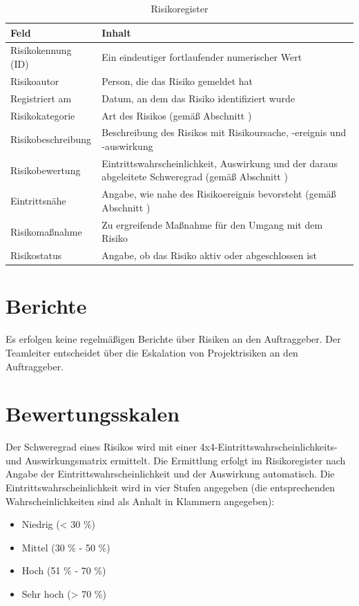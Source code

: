 \documentclass[a4paper,11pt,listof=numbered,glossary=totoc,parskip=half,toc=bib]{scrreprt}
\begin{document}
\begin{table}
\begin{tabularx}{\textwidth}{lX}
	\toprule
	Feld & Inhalt \\
	\midrule
	Risikokennung (ID) & Ein eindeutiger fortlaufender numerischer Wert \\
	 Risikoautor& Person, die das Risiko gemeldet hat \\
	 Registriert am& Datum, an dem das Risiko identifiziert wurde\\
	 Risikokategorie& Art des Risikos (gemäß Abschnitt \nameref{subsec:risikokategorien})\\
	 Risikobeschreibung& Beschreibung des Risikos mit Risikoursache, -ereignis und -auswirkung\\
	 Risikobewertung& Eintrittswahrscheinlichkeit, Auswirkung und der daraus abgeleitete Schweregrad (gemäß Abschnitt \nameref{subsec:bewertungsskalen})\\
	 Eintrittsnähe& Angabe, wie nahe des Risikoereignis bevorsteht (gemäß Abschnitt \nameref{subsec:eintrittsnaehe})\\
	 Risikomaßnahme& Zu ergreifende Maßnahme für den Umgang mit dem Risiko\\
	 Risikostatus& Angabe, ob das Risiko aktiv oder abgeschlossen ist\\
	 \bottomrule
	 
\end{tabularx}
\caption{Risikoregister}
\label{tab:risikoregister}
\end{table}
	
\section{Berichte}

Es erfolgen keine regelmäßigen Berichte über Risiken an den Auftraggeber. Der Teamleiter entscheidet über die Eskalation von Projektrisiken an den Auftraggeber.

\section{Bewertungsskalen}
\label{subsec:bewertungsskalen}

Der Schweregrad eines Risikos wird mit einer 4x4-Eintrittswahrscheinlichkeits- und Auswirkungsmatrix ermittelt. Die Ermittlung erfolgt im Risikoregister nach Angabe der Eintrittswahrscheinlichkeit und der Auswirkung automatisch.
Die Eintrittswahrscheinlichkeit wird in vier Stufen angegeben (die entsprechenden Wahrscheinlichkeiten sind als Anhalt in Klammern angegeben):
\begin{itemize}
	\item Niedrig (< 30 \%)
	\item Mittel (30 \% - 50 \%)
	\item Hoch (51 \% - 70 \%)
	\item Sehr hoch (> 70 \%)
\end{itemize}
\end{document}

